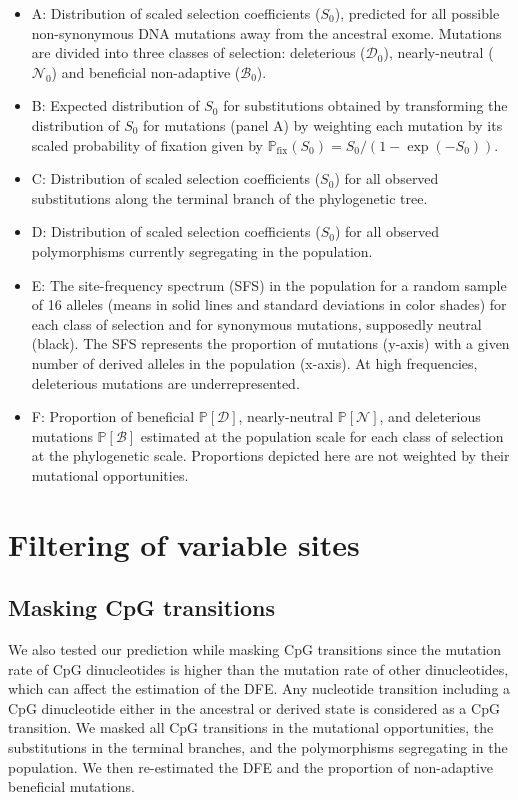 \documentclass{article}
\newcommand{\proba}{\mathbb{P}}
\newcommand{\Sphy}{S_{0}}
\newcommand{\SphyDel}{\mathcal{D}_0}
\newcommand{\SphyNeu}{\mathcal{N}_0}
\newcommand{\SphyBen}{\mathcal{B}_0}
\newcommand{\SpopDel}{\mathcal{D}}
\newcommand{\SpopNeu}{\mathcal{N}}
\newcommand{\SpopBen}{\mathcal{B}}
\newcommand{\ProbaPopDel}{\proba [ \SpopDel]}
\newcommand{\ProbaPopNeu}{\proba [ \SpopNeu ]}
\newcommand{\ProbaPopBen}{\proba [ \SpopBen ]}
\begin{document}
    \small
    \begin{itemize}[itemsep=0pt]
        \item A: Distribution of scaled selection coefficients ($\Sphy$), predicted for all possible non-synonymous DNA mutations away from the ancestral exome.
        Mutations are divided into three classes of selection: deleterious ($\SphyDel$), nearly-neutral ($\SphyNeu$) and beneficial non-adaptive ($\SphyBen$).
        \item B: Expected distribution of $\Sphy$ for substitutions obtained by transforming the distribution of $\Sphy$ for mutations (panel A) by weighting each mutation by its scaled probability of fixation given by $\proba_{\text{fix}} (\Sphy) = \Sphy/(1-\exp(-\Sphy))$.
        \item C: Distribution of scaled selection coefficients ($\Sphy$) for all observed substitutions along the terminal branch of the phylogenetic tree.
        \item D: Distribution of scaled selection coefficients ($\Sphy$) for all observed polymorphisms currently segregating in the population.
        \item E: The site-frequency spectrum (SFS) in the population for a random sample of 16 alleles (means in solid lines and standard deviations in color shades) for each class of selection and for synonymous mutations, supposedly neutral (black). The SFS represents the proportion of mutations (y-axis) with a given number of derived alleles in the population (x-axis). At high frequencies, deleterious mutations are underrepresented.
        \item F: Proportion of beneficial $\ProbaPopDel$, nearly-neutral $\ProbaPopNeu$, and deleterious mutations $\ProbaPopBen$  estimated at the population scale for each class of selection at the phylogenetic scale. Proportions depicted here are not weighted by their mutational opportunities.
    \end{itemize}
    \normalsize

    \section{Filtering of variable sites}

    \subsection{Masking CpG transitions}
    We also tested our prediction while masking CpG transitions since the mutation rate of CpG dinucleotides is higher than the mutation rate of other dinucleotides, which can affect the estimation of the DFE.
    Any nucleotide transition including a CpG dinucleotide either in the ancestral or derived state is considered as a CpG transition.
    We masked all CpG transitions in the mutational opportunities, the substitutions in the terminal branches, and the polymorphisms segregating in the population. We then re-estimated the DFE and the proportion of non-adaptive beneficial mutations.
\end{document}
